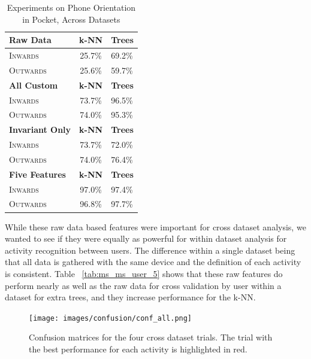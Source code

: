 \begin{table}[ht]
\centering
\caption{Experiments on Phone Orientation in Pocket, Across Datasets}
\begin{tabular}{lcl}
\toprule
\multicolumn{1}{l}{\textbf{Raw Data}} & \multicolumn{1}{c}{\textbf{k-NN}} & \multicolumn{1}{c}{\textbf{Trees}}  \\ \midrule
\textsc{Inwards} & 25.7\% & 69.2\% \\
\textsc{Outwards}     & 25.6\% & 59.7\% \\
\toprule 
\multicolumn{1}{l}{\textbf{All Custom}} & \multicolumn{1}{c}{\textbf{k-NN}} & \multicolumn{1}{c}{\textbf{Trees}}  \\ \midrule 
\textsc{Inwards} & 73.7\% & 96.5\% \\
\textsc{Outwards}     & 74.0\% & 95.3\% \\
\toprule 
\multicolumn{1}{l}{\textbf{Invariant Only}} & \multicolumn{1}{c}{\textbf{k-NN}} & \multicolumn{1}{c}{\textbf{Trees}}  \\ \midrule
\textsc{Inwards} & 73.7\% & 72.0\% \\
\textsc{Outwards}     & 74.0\% & 76.4\% \\
\toprule 
\multicolumn{1}{l}{\textbf{Five Features}} & \multicolumn{1}{c}{\textbf{k-NN}} & \multicolumn{1}{c}{\textbf{Trees}}  \\ \midrule
\textsc{Inwards} & 97.0\% & 97.4\% \\
\textsc{Outwards}     & 96.8\% & 97.7\% \\
\bottomrule
\end{tabular}
\label{tab:in_out}
\end{table}

While these raw data based features were important for cross dataset analysis, we wanted to see if they were equally as powerful for within dataset analysis for activity recognition between users. The difference within a single dataset being that all data is gathered with the same device and the definition of each activity is consistent. Table ~\ref{tab:ms_ms_user_5} shows that these raw features do perform nearly as well as the raw data for cross validation by user within a dataset for extra trees, and they increase performance for the k-NN. 


\begin{figure}[ht]
  \texttt{[image: images/confusion/conf\_all.png]}
    \caption{Confusion matrices for the four cross dataset trials. The trial with the best performance for each activity is highlighted in red.}
    \label{fig:conf_all}
\end{figure}

